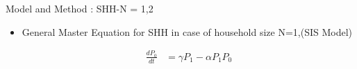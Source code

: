 \documentclass[smaller,aspectratio=169, toc=bibliography]{beamer}
\begin{document}
\begin{frame}[fragile]{Model and Method : SHH-N = 1,2}	
\begin{itemize}	
	\item General Master Equation for SHH in case of household size N=1,(SIS Model)

	\begin{equation*}
		\begin{aligned}
			{\frac{dP_0}{dt}} & = \gamma P_{1} - \alpha P_{1} P_{0} \\					
		\end{aligned}
	\end{equation*}



\end{itemize}
\end{frame}
\end{document}
